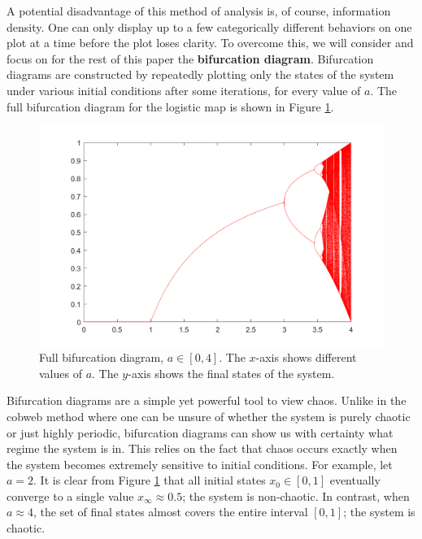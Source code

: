\documentclass[twocolumn,amsmath,amssymb,aps]{revtex4}
\begin{document}
A potential disadvantage of this method of analysis is, of course, information density. One can only display up to a few categorically different behaviors on one plot at a time before the plot loses clarity. To overcome this, we will consider and focus on for the rest of this paper the \textbf{bifurcation diagram}. Bifurcation diagrams are constructed by repeatedly plotting only the states of the system under various initial conditions after some iterations, for every value of $a$. The full bifurcation diagram for the logistic map is shown in Figure \ref{fig:logistic_2}.

\begin{figure}[!htb]
	\centering
	\includegraphics[scale=0.25]{logistic_2.png}
	\caption{Full bifurcation diagram, $a \in [0,4]$. The $x$-axis shows different values of $a$. The $y$-axis shows the final states of the system.}
	\label{fig:logistic_2}
\end{figure}




Bifurcation diagrams are a simple yet powerful tool to view chaos. Unlike in the cobweb method where one can be unsure of whether the system is purely chaotic or just highly periodic, bifurcation diagrams can show us with certainty what regime the system is in. This relies on the fact that chaos occurs exactly when the system becomes extremely sensitive to initial conditions. For example, let $a = 2$. It is clear from Figure \ref{fig:logistic_2} that all initial states $x_0\in [0,1]$ eventually converge to a single value $x_\infty \approx 0.5$; the system is non-chaotic. In contrast, when $a \approx 4$, the set of final states almost covers the entire interval $[0,1]$; the system is chaotic. 
\end{document}
